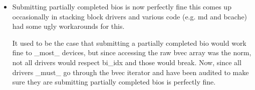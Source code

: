 \documentclass[a4paper,11pt,english]{sphinxmanual}
\begin{document}
\begin{itemize}
Care must be taken to ensure the biovec isn\textquotesingle{}t freed while the split bio is
still using it, in case the original bio completes first, though. Using
bio\_chain() when splitting bios helps with this.

\item {} 
Submitting partially completed bios is now perfectly fine \sphinxhyphen{} this comes up
occasionally in stacking block drivers and various code (e.g. md and
bcache) had some ugly workarounds for this.

It used to be the case that submitting a partially completed bio would work
fine to \_most\_ devices, but since accessing the raw bvec array was the
norm, not all drivers would respect bi\_idx and those would break. Now,
since all drivers \_must\_ go through the bvec iterator \sphinxhyphen{} and have been
audited to make sure they are \sphinxhyphen{} submitting partially completed bios is
perfectly fine.

\end{itemize}
\end{document}
